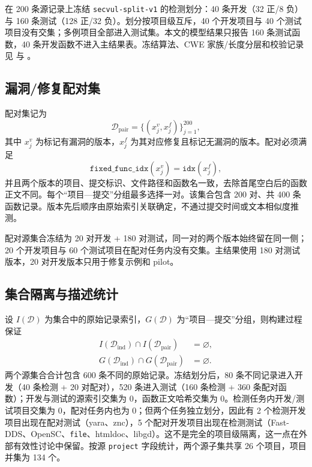\documentclass[conference]{IEEEtran}
\newcommand{\Dind}{\mathcal{D}_{\mathrm{ind}}}
\newcommand{\Dpair}{\mathcal{D}_{\mathrm{pair}}}
\begin{document}
在 200 条源记录上冻结 \texttt{secvul-split-v1} 的检测划分：40 条开发（32 正/8 负）与 160 条测试（128 正/32 负）。划分按项目级互斥，40 个开发项目与 40 个测试项目没有交集；多例项目全部进入测试集。本文的模型结果只报告 160 条测试函数，40 条开发函数不进入主结果表。冻结算法、CWE 家族/长度分层和校验记录见  与 。

\subsection{漏洞/修复配对集}
配对集记为
\begin{equation}
\Dpair=\{(x_j^{v},x_j^{f})\}_{j=1}^{200},
\end{equation}
其中 $x_j^{v}$ 为标记有漏洞的版本，$x_j^{f}$ 为其对应修复且标记无漏洞的版本。配对必须满足
\begin{equation}
\texttt{fixed\_func\_idx}(x_j^{v})=\texttt{idx}(x_j^{f}),
\end{equation}
并且两个版本的项目、提交标识、文件路径和函数名一致，去除首尾空白后的函数正文不同。每个“项目—提交”分组最多选择一对。该集合包含 200 对、共 400 条函数记录。版本先后顺序由原始索引关联确定，不通过提交时间或文本相似度推测。

配对源集合冻结为 20 对开发 + 180 对测试，同一对的两个版本始终留在同一侧；20 个开发项目与 60 个测试项目在配对任务内没有交集。主结果使用 180 对测试版本，20 对开发版本只用于修复示例和 pilot。

\subsection{集合隔离与描述统计}
设 $I(\mathcal{D})$ 为集合中的原始记录索引，$G(\mathcal{D})$ 为“项目—提交”分组，则构建过程保证
\begin{align}
I(\Dind)\cap I(\Dpair)&=\varnothing,\\
G(\Dind)\cap G(\Dpair)&=\varnothing.
\end{align}
两个源集合合计包含 600 条不同的原始记录。冻结划分后，80 条不同记录进入开发（40 条检测 + 20 对配对），520 条进入测试（160 条检测 + 360 条配对函数）；开发与测试的源索引交集为 0，函数正文哈希交集为 0。检测任务内开发/测试项目交集为 0，配对任务内也为 0；但两个任务独立划分，因此有 2 个检测开发项目出现在配对测试（yara、znc），5 个配对开发项目出现在检测测试（Fast-DDS、OpenSC、\texttt{file}、htmldoc、libgd）。这不是完全的项目级隔离，这一点在外部有效性讨论中保留。按源 \texttt{project} 字段统计，两个源子集共享 26 个项目，项目并集为 134 个。
\end{document}
